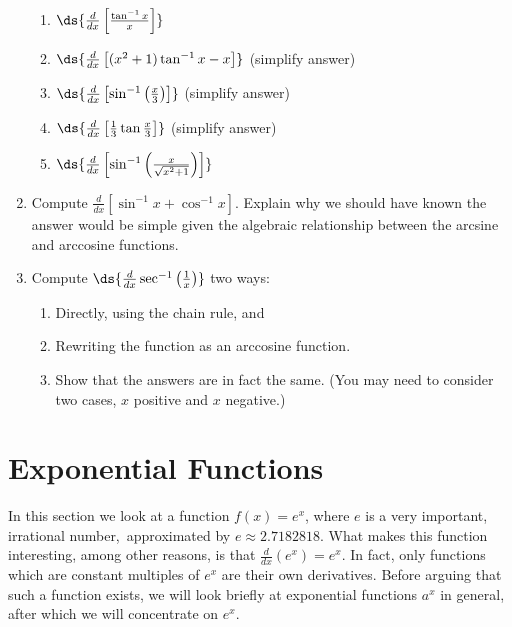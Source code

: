 \begin{multicols}{2}
\begin{enumerate}
\begin{enumerate}
  \item $\ds{\frac{d}{dx}\left[\frac{\tan^{-1}x}x\right]}$
  \item $\ds{\frac{d}{dx}\left[(x^2+1)\tan^{-1}x-x\right]}$ (simplify answer)
  \item $\ds{\frac{d}{dx}\left[\sin^{-1}\left(\frac{x}3\right)\right]}$ 
            (simplify answer)
  \item $\ds{\frac{d}{dx}\left[\frac13\tan\frac{x}3\right]}$ (simplify answer)
  \item $\ds{\frac{d}{dx}\left[\sin^{-1}\left(\frac{x}{\sqrt{x^2+1}}
                 \right)\right]}$
  \end{enumerate}
\item Compute $\frac{d}{dx}\left[\sin^{-1}x+\cos^{-1}x\right]$.
 Explain why we should have known the answer would be simple given
 the algebraic relationship between the arcsine and arccosine functions.
\item Compute $\ds{\frac{d}{dx}\sec^{-1}\left(\frac1x\right)}$ two ways:
 \begin{enumerate}
 \item Directly, using the chain rule, and
 \item Rewriting the function as an arccosine function.
 \item Show that the answers are in fact the same.  (You may need to 
       consider two cases, $x$ positive and $x$ negative.)
 \end{enumerate}

\end{enumerate}
\end{multicols}












\qquad\newpage

\section{Exponential Functions}
In this section we look at a function $f(x)=e^x$, where
$e$ is a very important, irrational number,\footnotemark\  approximated by
$e\approx2.7182818$.
What makes this function interesting, among other reasons, is
that $\frac{d}{dx}(e^x)=e^x$. In fact, only functions which are constant
multiples of $e^x$ are their own derivatives.
Before arguing that such a function exists, we will look briefly
at exponential functions $a^x$ in general, after which we will 
concentrate on $e^x$.



